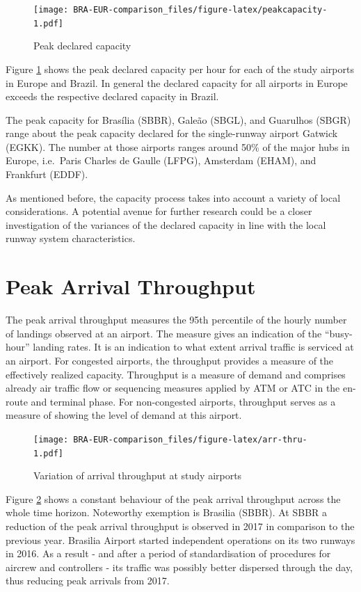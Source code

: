 \documentclass[
]{book}
\begin{document}
\begin{figure}
\centering
\texttt{[image: BRA-EUR-comparison\_files/figure-latex/peakcapacity-1.pdf]}
\caption{\label{fig:peakcapacity}Peak declared capacity}
\end{figure}

Figure \ref{fig:peakcapacity} shows the peak declared capacity per hour for each of the study airports in Europe and Brazil.
In general the declared capacity for all airports in Europe exceeds the respective declared capacity in Brazil.

The peak capacity for Brasília (SBBR), Galeão (SBGL), and Guarulhos (SBGR) range about the peak capacity declared for the single-runway airport Gatwick (EGKK). The number at those airports ranges around 50\% of the major hubs in Europe, i.e.~Paris Charles de Gaulle (LFPG), Amsterdam (EHAM), and Frankfurt (EDDF).

As mentioned before, the capacity process takes into account a variety of local considerations.
A potential avenue for further research could be a closer investigation of the variances of the declared capacity in line with the local runway system characteristics.

\hypertarget{peak-arrival-throughput}{%
\section{Peak Arrival Throughput}\label{peak-arrival-throughput}}

The peak arrival throughput measures the 95th percentile of the hourly number of landings observed at an airport. The measure gives an indication of the ``busy-hour'' landing rates. It is an indication to what extent arrival traffic is serviced at an airport. For congested airports, the throughput provides a measure of the effectively realized capacity. Throughput is a measure of demand and comprises already air traffic flow or sequencing measures applied by ATM or ATC in the en-route and terminal phase. For non-congested airports, throughput serves as a measure of showing the level of demand at this airport.



\begin{figure}
\centering
\texttt{[image: BRA-EUR-comparison\_files/figure-latex/arr-thru-1.pdf]}
\caption{\label{fig:arr-thru}Variation of arrival throughput at study airports}
\end{figure}

Figure \ref{fig:arr-thru} shows a constant behaviour of the peak arrival throughput across the whole time horizon. Noteworthy exemption is Brasilia (SBBR).
At SBBR a reduction of the peak arrival throughput is observed in 2017 in comparison to the previous year.
Brasilia Airport started independent operations on its two runways in 2016.
As a result - and after a period of standardisation of procedures for aircrew and controllers - its traffic was possibly better dispersed through the day, thus reducing peak arrivals from 2017.
\end{document}
